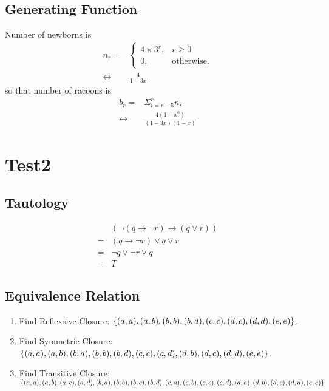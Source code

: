 \documentclass{sig-alternate-05-2015}
\begin{document}
\subsection{Generating Function}
Number of newborns is \begin{align}
	n_r = & \begin{cases}
	4 \times 3^r, & r \ge 0\\
	0, & \text{otherwise}.
	\end{cases}\\
	\leftrightarrow & \frac{4}{1 - 3x}
\end{align} so that number of racoons is \begin{align}
	b_r = & \Sigma_{i = r - 5}^{r} n_i\\
	\leftrightarrow & \frac{4(1 - x^6)}{(1 - 3x)(1 - x)}
\end{align}

\clearpage

\section{Test2}
\subsection{Tautology}
\begin{align}
	& (\neg (q \rightarrow \neg r) \rightarrow (q \vee r))\\
	= & (q \rightarrow \neg r) \vee q \vee r\\
	= & \neg q \vee \neg r \vee q\\
	= & T
\end{align}

\subsection{Equivalence Relation}
\begin{enumerate}
	\item Find Reflexsive Closure: $\{(a, a), (a, b), (b, b), (b, d), \\(c, c), (d, c), (d, d), (e, e)\}$.
	\item Find Symmetric Closure: $\{(a, a), (a, b), (b, a), (b, b), \\(b, d), (c, c), (c, d), (d, b), (d, c), (d, d), (e, e)\}$.
	\item Find Transitive Closure: $\{(a, a), (a, b), (a, c), (a, d), \\(b, a), (b, b), (b, c), (b, d), (c, a), (c, b), (c, c), (c, d), (d, a), \\(d, b), (d, c), (d, d), (e, e)\}$
\end{enumerate}
\end{document}
